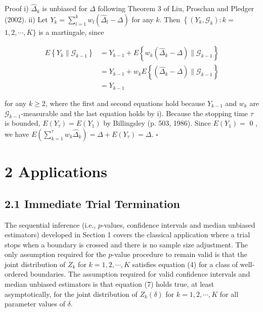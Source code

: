 \documentclass[10pt]{article}
\begin{document}
Proof i) $\hat{\Delta}_{k}$ is unbiased for $\Delta$ following Theorem 3 of Liu, Proschan and Pledger (2002). ii) Let $Y_{k}=\sum_{l=1}^{k} w_{l}\left(\hat{\Delta}_{l}-\Delta\right)$ for any $k$. Then $\left\{\left(Y_{k}, \mathcal{G}_{k}\right): k=\right.$ $1,2, \cdots, K\}$ is a martingale, since

$$
\begin{aligned}
E\left\{Y_{k} \| \mathcal{G}_{k-1}\right\} & =Y_{k-1}+E\left\{w_{k}\left(\hat{\Delta}_{k}-\Delta\right) \| \mathcal{G}_{k-1}\right\} \\
& =Y_{k-1}+w_{k} E\left\{\left(\hat{\Delta}_{k}-\Delta\right) \| \mathcal{G}_{k-1}\right\} \\
& =Y_{k-1}
\end{aligned}
$$

for any $k \geq 2$, where the first and second equations hold because $Y_{k-1}$ and $w_{k}$ are $\mathcal{G}_{k-1}$-measurable and the last equation holds by i). Because the stopping time $\tau$ is bounded, $E\left(Y_{\tau}\right)=E\left(Y_{1}\right)$ by Billingsley (p. 503, 1986). Since $E\left(Y_{1}\right)=$ 0 , we have $E\left(\sum_{k=1}^{\tau} w_{k} \hat{\Delta}_{k}\right)=\Delta+E\left(Y_{\tau}\right)=\Delta$. \(\square\)

\section*{2 Applications}
\subsection*{2.1 Immediate Trial Termination}
The sequential inference (i.e., $p$-values, confidence intervals and median unbiased estimators) developed in Section 1 covers the classical application where a trial stops when a boundary is crossed and there is no sample size adjustment. The only assumption required for the $p$-value procedure to remain valid is that the joint distribution of $Z_{k}$ for $k=1,2, \cdots, K$ satisfies equation (4) for a class of well-ordered boundaries. The assumption required for valid confidence intervals and median unbiased estimators is that equation (7) holds true, at least asymptotically, for the joint distribution of $Z_{k}(\delta)$ for $k=1,2, \cdots, K$ for all parameter values of $\delta$.
\end{document}

